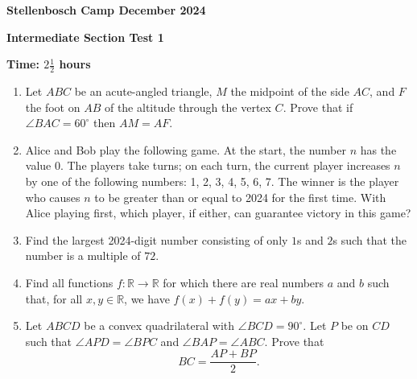 \documentclass[12pt]{article}
\begin{document}
\begin{center} \Large
    \textbf{Stellenbosch Camp December 2024}
    
    \textbf{Intermediate Section Test 1}
    
    \textbf{Time: \(2 \frac{1}{2}\) hours}
\end{center}

\vfill
\begin{enumerate}[itemsep=\fill,topsep=\fill]
\item Let $ABC$ be an acute-angled triangle, $M$ the midpoint of the side $AC$, and $F$ the foot on $AB$ of the altitude through the vertex $C$. Prove that if $\angle BAC = 60^{\circ}$ then $AM = AF$. 
\item Alice and Bob play the following game. At the start, the number \(n\) has the value 0. The players take turns; on each turn, the current player increases \(n\) by one of the following numbers: 1, 2, 3, 4, 5, 6, 7. The winner is the player who causes \(n\) to be greater than or equal to 2024 for the first time. With Alice playing first, which player, if either, can guarantee victory in this game?
\item Find the largest 2024-digit number consisting of only $1$s and $2$s such that the number is a multiple of $72$.
\item Find all functions \(f: \mathbb{R} \rightarrow \mathbb{R}\) for which there are real numbers \(a\) and \(b\) such that, for all \(x, y \in \mathbb{R}\), we have \(f(x) + f(y) = ax + by\).
\item Let $ABCD$ be a convex quadrilateral with $\angle BCD = 90^{\circ}$. Let $P$ be on $CD$ such that $\angle APD = \angle BPC$ and $\angle BAP = \angle ABC$. Prove that \[BC = \frac{AP + BP}{2}.\]
\end{enumerate}
\end{document}
